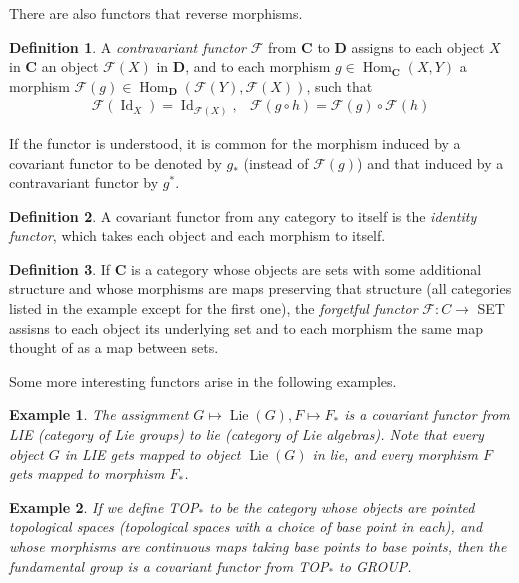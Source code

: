 \documentclass{article}
\DeclareMathOperator{\Id}{Id}
\DeclareMathOperator{\Lie}{Lie}
\DeclareMathOperator{\Hom}{Hom}
\newtheorem{example}{Example}[section]
\theoremstyle{remark}
\theoremstyle{definition}
\newtheorem{definition}{Definition}[section]
\begin{document}
    There are also functors that reverse morphisms. 

    \begin{definition}
    A \textit{contravariant functor} $\mathcal{F}$ from $\mathbf{C}$ to $\mathbf{D}$ assigns to each object $X$ in $\mathbf{C}$ an object $\mathcal{F}(X)$ in $\mathbf{D}$, and to each morphism $g \in \Hom_\mathbf{C} (X, Y)$ a morphism $\mathcal{F}(g) \in \Hom_\mathbf{D}(\mathcal{F}(Y), \mathcal{F}(X))$, such that
    \begin{align*}
        \mathcal{F}(\Id_X) = \Id_{\mathcal{F}(X)}, & \mathcal{F}(g \circ h) = \mathcal{F}(g) \circ \mathcal{F}(h)
    \end{align*}
    \end{definition}

    If the functor is understood, it is common for the morphism induced by a covariant functor to be denoted by $g_*$ (instead of $\mathcal{F} (g)$) and that induced by a contravariant functor by $g^*$. 

    \begin{definition}
    A covariant functor from any category to itself is the \textit{identity functor}, which takes each object and each morphism to itself. 
    \end{definition}

    \begin{definition}
    If $\mathbf{C}$ is a category whose objects are sets with some additional structure and whose morphisms are maps preserving that structure (all categories listed in the example except for the first one), the \textit{forgetful functor} $\mathcal{F}: C \longrightarrow $ SET assisns to each object its underlying set and to each morphism the same map thought of as a map between sets. 
    \end{definition}

    Some more interesting functors arise in the following examples. 

    \begin{example}
    The assignment $G \mapsto \Lie(G), F \mapsto F_*$ is a covariant functor from LIE (category of Lie groups) to lie (category of Lie algebras). Note that every object $G$ in LIE gets mapped to object $\Lie(G)$ in lie, and every morphism $F$ gets mapped to morphism $F_*$. 
    \end{example}

    \begin{example}
    If we define TOP$_*$ to be the category whose objects are \textit{pointed topological spaces} (topological spaces with a choice of base point in each), and whose morphisms are continuous maps taking base points to base points, then the fundamental group is a covariant functor from TOP$_*$ to GROUP. 
    \end{example}
\end{document}
